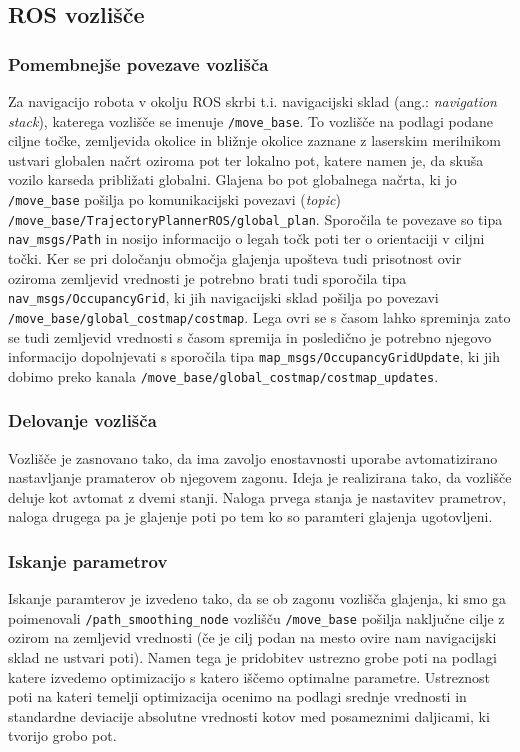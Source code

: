 \documentclass[10pt,a4paper]{article}
\begin{document}
\subsection{ROS vozlišče}

\subsubsection{Pomembnejše povezave vozlišča}


Za navigacijo robota v okolju ROS skrbi t.i. navigacijski sklad (ang.: \textit{navigation stack}), katerega vozlišče se imenuje \verb|/move_base|. To vozlišče na podlagi podane ciljne točke, zemljevida okolice in bližnje okolice zaznane z laserskim merilnikom ustvari globalen načrt oziroma pot ter lokalno pot, katere namen je, da skuša vozilo karseda približati globalni. Glajena bo pot globalnega načrta, ki jo \verb|/move_base| pošilja po komunikacijski povezavi (\textit{topic}) \verb|/move_base/TrajectoryPlannerROS/global_plan|. Sporočila te povezave so tipa \verb|nav_msgs/Path| in nosijo informacijo o legah točk poti ter o orientaciji v ciljni točki. Ker se pri določanju območja glajenja upošteva tudi prisotnost ovir oziroma zemljevid vrednosti je potrebno brati tudi sporočila tipa \verb|nav_msgs/OccupancyGrid|, ki jih navigacijski sklad pošilja po povezavi \verb|/move_base/global_costmap/costmap|. Lega ovri se s časom lahko spreminja zato se tudi zemljevid vrednosti s časom spremija in posledično je potrebno njegovo informacijo dopolnjevati s sporočila tipa \verb|map_msgs/OccupancyGridUpdate|, ki jih dobimo preko kanala
\verb|/move_base/global_costmap/costmap_updates|.

\subsubsection{Delovanje vozlišča}

Vozlišče je zasnovano tako, da ima zavoljo enostavnosti uporabe avtomatizirano nastavljanje pramaterov ob njegovem zagonu. Ideja je realizirana tako, da vozlišče deluje kot avtomat z dvemi stanji. Naloga prvega stanja je nastavitev prametrov, naloga drugega pa je glajenje poti po tem ko so paramteri glajenja ugotovljeni.

\subsubsection{Iskanje parametrov}

Iskanje paramterov je izvedeno tako, da se ob zagonu vozlišča glajenja, ki smo ga poimenovali \verb|/path_smoothing_node| vozlišču \verb|/move_base| pošilja naključne cilje z ozirom na zemljevid vrednosti (če je cilj podan na mesto ovire nam navigacijski sklad ne ustvari poti). Namen tega je pridobitev ustrezno grobe poti na podlagi katere izvedemo optimizacijo s katero iščemo optimalne parametre. Ustreznost poti na kateri temelji optimizacija ocenimo na podlagi srednje vrednosti in standardne deviacije absolutne vrednosti kotov med posameznimi daljicami, ki tvorijo grobo pot.
\end{document}
